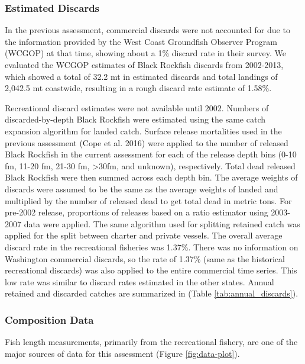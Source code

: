 \documentclass[11pt,
  english,
  letterpaper,
]{article}
\begin{document}
\hypertarget{estimated-discards}{%
\subsubsection{Estimated Discards}\label{estimated-discards}}

In the previous assessment, commercial discards were not accounted for due to the information provided by the West Coast Groundfish Observer Program (WCGOP) at that time, showing about a 1\% discard rate in their survey. We evaluated the WCGOP estimates of Black Rockfish discards from 2002-2013, which showed a total of 32.2 mt in estimated discards and total landings of 2,042.5 mt coastwide, resulting in a rough discard rate estimate of 1.58\%.

Recreational discard estimates were not available until 2002. Numbers of discarded-by-depth Black Rockfish were estimated using the same catch expansion algorithm for landed catch. Surface release mortalities used in the previous assessment (Cope et al. 2016) were applied to the number of released Black Rockfish in the current assessment for each of the release depth bins (0-10 fm, 11-20 fm, 21-30 fm, \textgreater30fm, and unknown), respectively. Total dead released Black Rockfish were then summed across each depth bin. The average weights of discards were assumed to be the same as the average weights of landed and multiplied by the number of released dead to get total dead in metric tons. For pre-2002 release, proportions of releases based on a ratio estimator using 2003-2007 data were applied. The same algorithm used for splitting retained catch was applied for the split between charter and private vessels. The overall average discard rate in the recreational fisheries was 1.37\%. There was no information on Washington commercial discards, so the rate of 1.37\% (same as the historical recreational discards) was also applied to the entire commercial time series. This low rate was similar to discard rates estimated in the other states. Annual retained and discarded catches are summarized in (Table \ref{tab:annual_discards}).

\hypertarget{composition-data}{%
\subsubsection{Composition Data}\label{composition-data}}

Fish length measurements, primarily from the recreational fishery, are one of the major sources of data for this assessment (Figure \ref{fig:data-plot}).
\end{document}
